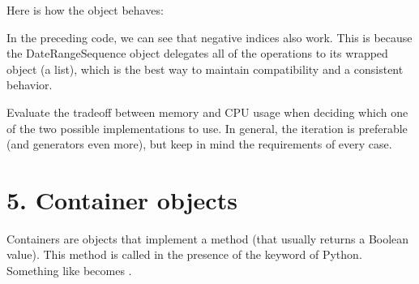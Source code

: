 \documentclass[a4paper,10pt,english]{sphinxmanual}
\begin{document}
Here is how the object behaves:

\begin{sphinxVerbatim}[commandchars=\\\{\}]
       
   
    
\PYG{p}{[}\PYG{p}{]}
\PYG{p}{[}\PYG{p}{]}
\PYG{p}{[}\PYG{p}{]}
\end{sphinxVerbatim}

In the preceding code, we can see that negative indices also work. This is because the DateRangeSequence object
delegates all of the operations to its wrapped object (a list), which is the best way to maintain compatibility and a
consistent behavior.

Evaluate the trade\sphinxhyphen{}off between memory and CPU usage when deciding which one of the two possible implementations to use.
In general, the iteration is preferable (and generators even more), but keep in mind the requirements of every case.


\section{5. Container objects}
\label{\detokenize{chapters/2_pythonic_code/index:container-objects}}
Containers are objects that implement a  method (that usually returns a Boolean value). This method is
called in the presence of the  keyword of Python. Something like  becomes
.
\end{document}
